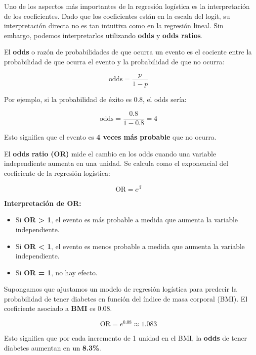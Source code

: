 \documentclass[
  letterpaper,
  DIV=11,
  numbers=noendperiod]{scrreprt}
\providecommand{\tightlist}{%
  \setlength{\itemsep}{0pt}\setlength{\parskip}{0pt}}
\begin{document}
Uno de los aspectos más importantes de la regresión logística es la
interpretación de los coeficientes. Dado que los coeficientes están en
la escala del logit, su interpretación directa no es tan intuitiva como
en la regresión lineal. Sin embargo, podemos interpretarlos utilizando
\textbf{odds} y \textbf{odds ratios}.

El \textbf{odds} o razón de probabilidades de que ocurra un evento es el
cociente entre la probabilidad de que ocurra el evento y la probabilidad
de que no ocurra:

\[
\text{odds} = \frac{p}{1 - p}
\]

Por ejemplo, si la probabilidad de éxito es 0.8, el odds sería:

\[
\text{odds} = \frac{0.8}{1 - 0.8} = 4
\]

Esto significa que el evento es \textbf{4 veces más probable} que no
ocurra.

El \textbf{odds ratio (OR)} mide el cambio en los odds cuando una
variable independiente aumenta en una unidad. Se calcula como el
exponencial del coeficiente de la regresión logística:

\[
\text{OR} = e^{\beta}
\]

\textbf{Interpretación de OR:}

\begin{itemize}
\tightlist
\item
  Si \textbf{OR \textgreater{} 1}, el evento es más probable a medida
  que aumenta la variable independiente.
\item
  Si \textbf{OR \textless{} 1}, el evento es menos probable a medida que
  aumenta la variable independiente.
\item
  Si \textbf{OR = 1}, no hay efecto.
\end{itemize}

\begin{tcolorbox}[enhanced jigsaw, leftrule=.75mm, breakable, colbacktitle=quarto-callout-tip-color!10!white, bottomrule=.15mm, colframe=quarto-callout-tip-color-frame, toprule=.15mm, colback=white, coltitle=black, bottomtitle=1mm, left=2mm, title=\textcolor{quarto-callout-tip-color}{\faLightbulb}\hspace{0.5em}{Ejemplo}, opacityback=0, arc=.35mm, opacitybacktitle=0.6, toptitle=1mm, titlerule=0mm, rightrule=.15mm]

Supongamos que ajustamos un modelo de regresión logística para predecir
la probabilidad de tener diabetes en función del índice de masa corporal
(BMI). El coeficiente asociado a \textbf{BMI} es 0.08.

\[
\text{OR} = e^{0.08} \approx 1.083
\]

Esto significa que por cada incremento de 1 unidad en el BMI, la
\textbf{odds} de tener diabetes aumentan en un \textbf{8.3\%}.

\end{tcolorbox}
\end{document}

